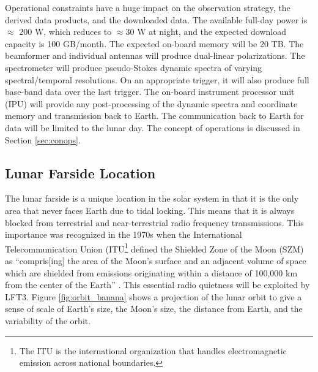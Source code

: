 Operational constraints have a huge impact on the observation strategy, the derived data products, and the downloaded data.  The available full-day power is $\approx$ 200 W, which reduces to $\approx$30 W at night, and the expected download capacity is 100 GB/month.  The expected on-board memory will be 20 TB.  The beamformer and individual antennas will produce dual-linear polarizations.  The spectrometer will produce pseudo-Stokes dynamic spectra of varying spectral/temporal resolutions. On an appropriate trigger, it will also produce full base-band data over the last trigger. 
The on-board instrument processor unit (IPU) will provide any post-processing of the dynamic spectra and coordinate memory and transmission back to Earth.  The communication back to Earth for data will be limited to the lunar day.  The concept of operations is discussed in Section \ref{sec:conops}.

\subsection{Lunar Farside Location}
The lunar farside is a unique location in the solar system in that it is the only area that never faces Earth due to tidal locking.  This means that it is always blocked from terrestrial and near-terrestrial radio frequency transmissions.  This importance was recognized in the 1970s when the International Telecommunication Union (ITU\footnote{The ITU is the international organization that handles electromagnetic emission across national boundaries.} defined the Shielded Zone of the Moon (SZM) as “compris[ing] the area of the Moon’s surface and an adjacent volume of space which are shielded from emissions originating within a distance of 100,000 km from the center of the Earth” \citep{itu_rr_2024}.  This essential radio quietness will be exploited by LFT3.  Figure \ref{fig:orbit_banana} shows a projection of the lunar orbit to give a sense of scale of Earth's size, the Moon's size, the distance from Earth, and the variability of the orbit.

